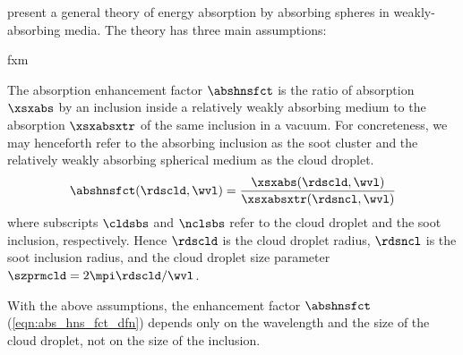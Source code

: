\documentclass[12pt]{article}
\begin{document}
\cite{MaS99} present a general theory of energy absorption by
absorbing spheres in weakly-absorbing media. 
The theory has three main assumptions:
\begin{enumerate*}
\item fxm
\end{enumerate*}
The absorption enhancement factor $\abshnsfct$ is the ratio of
absorption $\xsxabs$ by an inclusion inside a relatively weakly
absorbing medium to the absorption $\xsxabsxtr$ of the same inclusion
in a vacuum. 
For concreteness, we may henceforth refer to the absorbing inclusion
as the soot cluster and the relatively weakly absorbing spherical
medium as the cloud droplet.
\begin{equation}
\abshnsfct(\rdscld,\wvl) =
\frac{\xsxabs(\rdscld,\wvl)}{\xsxabsxtr(\rdsncl,\wvl)} 
\label{eqn:abs_hns_fct_dfn}
\end{equation}
where subscripts $\cldsbs$ and $\nclsbs$ refer to the cloud droplet
and the soot inclusion, respectively.
Hence $\rdscld$ is the cloud droplet radius, $\rdsncl$ is the soot 
inclusion radius, and the cloud droplet size parameter
$\szprmcld = 2\mpi\rdscld/\wvl$.

With the above assumptions, the enhancement factor $\abshnsfct$
(\ref{eqn:abs_hns_fct_dfn}) depends only on the wavelength and the
size of the cloud droplet, not on the size of the inclusion.
\end{document}
